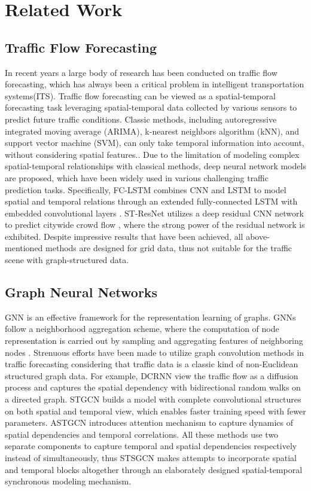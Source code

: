 \documentclass[sigconf]{acmart}
\theoremstyle{definition}
\begin{document}
\section{Related Work}
\subsection{Traffic Flow Forecasting}
In recent years a large body of research has been conducted on traffic flow forecasting, which has always been a critical problem in intelligent transportation systems(ITS)\cite{nagy2018survey}. Traffic flow forecasting can be viewed as a spatial-temporal forecasting task leveraging spatial-temporal data collected by various sensors to predict future traffic conditions. Classic methods, including autoregressive integrated moving average (ARIMA), k-nearest neighbors algorithm (kNN), and support vector machine (SVM), can only take temporal information into account, without considering spatial features.\cite{williams2003modeling,van2012short,jeong2013supervised}. Due to the limitation of modeling complex spatial-temporal relationships with classical methods, deep neural network models are proposed, which have been widely used in various challenging traffic prediction tasks. Specifically, FC-LSTM combines CNN and LSTM to model spatial and temporal relations through an extended fully-connected LSTM with embedded convolutional layers \cite{shi2015convolutional}. ST-ResNet utilizes a deep residual CNN network to predict citywide crowd flow \cite{zhang2017deep}, where the strong power of the residual network is exhibited. Despite impressive results that have been achieved, all above-mentioned methods are designed for grid data, thus not suitable for the traffic scene with graph-structured data.

 \subsection{Graph Neural Networks}
 GNN is an effective framework for the representation learning of graphs. GNNs follow a neighborhood aggregation scheme, where the computation of node representation is carried out by sampling and aggregating features of neighboring nodes \cite{kipf2016semi, hamilton2017inductive,long2021theoretically}. Strenuous efforts have been made to utilize graph convolution methods in traffic forecasting considering that traffic data is a classic kind of non-Euclidean structured graph data. For example, DCRNN \cite{li2018diffusion} view the traffic flow as a diffusion process and captures the spatial dependency with bidirectional random walks on a directed graph. STGCN \cite{yu2018spatio} builds a model with complete convolutional structures on both spatial and temporal view, which enables faster training speed with fewer parameters. ASTGCN \cite{guo2019attention} introduces attention mechanism to capture dynamics of spatial dependencies and temporal correlations. All these methods use two separate components to capture temporal and spatial dependencies respectively instead of simultaneously, thus STSGCN \cite{song2020spatial} makes attempts to incorporate spatial and temporal blocks altogether through an elaborately designed spatial-temporal synchronous modeling mechanism.
\end{document}
